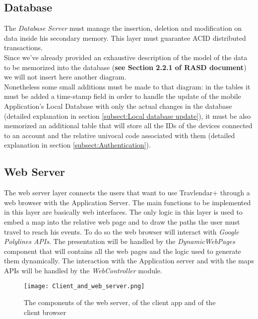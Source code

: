 \subsection{Database}
\label{subsect:Database}
	The \textit{Database Server} must manage the insertion, deletion and modification on data inside his secondary memory. This layer must guarantee ACID distributed transactions.\\
	Since we've already provided an exhaustive description of the model of the data to be memorized into the database (\textbf{see Section 2.2.1 of RASD document}) we will not insert here another diagram.\\
	Nonetheless some small additions must be made to that diagram: in the tables it must be added a time-stamp field in order to handle the update of the mobile Application's Local Database with only the actual changes in the database (detailed explanation in section \ref{subsect:Local database update}), it must be also memorized an additional table that will store all the IDs of the devices connected to an account and the relative univocal code associated with them (detailed explanation in section \ref{subsect:Authentication}).	

\subsection{Web Server}
\label{subsect:Web Server}
	The web server layer connects the users that want to use Travlendar+ through a web browser with the Application Server. \newline
	The main functions to be implemented in this layer are basically web interfaces.
	The only logic in this layer is used to embed a map into the relative web page and to draw the paths the user must travel to reach his events. To do so the web browser will interact with\textit{ Google Polylines APIs}.
	The presentation will be handled by the \textit{DynamicWebPages} component that will contains all the web pages and the logic used to generate them dynamically. The interaction with the Application server and with the maps APIs will be handled by the \textit{WebController} module.
	
\begin{figure}[H]
\begin{center}
		\hspace*{-0pt}
		\texttt{[image: Client\_and\_web\_server.png]}
\end{center}
\caption{The components of the web server, of the client app and of the client browser}
\end{figure}


